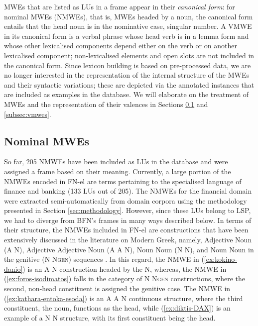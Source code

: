 \documentclass[output=paper,colorlinks,citecolor=brown]{langscibook}
\begin{document}
MWEs that are listed as LUs in a frame appear in their {\em{canonical form}}: for nominal MWEs (NMWEs), that is, MWEs headed by a noun, the canonical form entails that the head noun is in the nominative case, singular number. A VMWE in its canonical form is a verbal phrase whose head verb is in a lemma form and whose other lexicalised components depend either on the verb or on another lexicalised component; non-lexicalised elements and open slots are not included in the canonical form. 
Since lexicon building is based on pre-processed data, we are no longer interested in the representation of the internal structure of the MWEs and their syntactic variations; these are depicted via the annotated instances that are included as examples in the database. We will elaborate on the treatment of MWEs and the representation of their valences in Sections \ref{subsec:nmwes} and \ref{subsec:vmwes}.

\subsection{Nominal MWEs}
\label{subsec:nmwes}
So far, 205 NMWEs have been included as LUs in the database and were assigned a frame based on their meaning. Currently, a large portion of the NMWEs encoded in FN-el are terms pertaining to the specialised language of finance and banking (133 LUs out of 205). The NMWEs for the financial domain were extracted semi-automatically from domain corpora using the methodology presented in Section \ref{sec:methodology}. However, since these LUs belong to LSP, we had to diverge from BFN’s frames in many ways described below.
In terms of their structure, the NMWEs included in FN-el are constructions that have been extensively discussed in the literature on Modern Greek, namely, Adjective Noun (A N), Adjective Adjective Noun (A A N), Noun Noun (N N), and Noun Noun in the genitive (N N\textsc{gen}) sequences \citep{Anastasiadis-Symeonidis1986, Ralli2007, gavriilidou_nn_2013}. In this regard, the NMWE in (\ref{ex:kokino-danio}) is an A N construction headed by the N, whereas, the NMWE in (\ref{ex:foros-isodimatos}) falls in the category of N N\textsc{gen} constructions, where the second, non-head constituent is assigned the genitive case. The NMWE in (\ref{ex:kathara-entoka-esoda}) is an A A N continuous structure, where the third constituent, the noun, functions as the head, while (\ref{ex:diktis-DAX}) is an example of a N N structure, with its first constituent being the head.\largerpage
\end{document}
